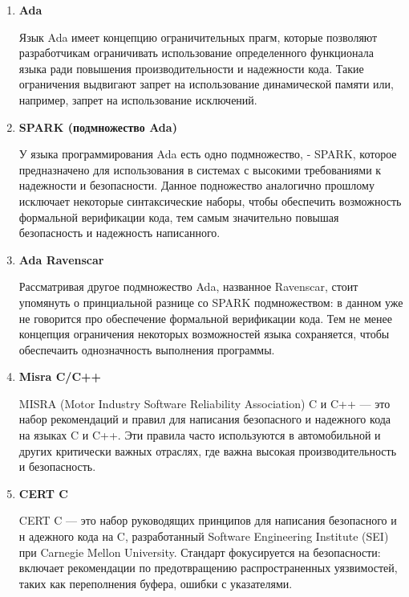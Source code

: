 \documentclass{mipt-thesis-bs}
\begin{document}
\begin{enumerate}
        \item \textbf{Ada}

        Язык Ada имеет концепцию ограничительных прагм, которые позволяют разработчикам ограничивать
        использование определенного функционала языка ради повышения производительности и надежности
        кода. Такие ограничения выдвигают запрет на использование динамической памяти или, например,
        запрет на использование исключений.

        \item \textbf{SPARK (подмножество Ada)}

        У языка программирования Ada есть одно подмножество, - SPARK, которое предназначено для
        использования в системах с высокими требованиями к надежности и безопасности. Данное
        подножество аналогично прошлому исключает некоторые синтаксические наборы, чтобы
        обеспечить возможность формальной верификации кода, тем самым значительно повышая
        безопасность и надежность написанного.

        \item \textbf{Ada Ravenscar}

        Рассматривая другое подмножество Ada, названное Ravenscar, стоит упомянуть о принциальной
        разнице со SPARK подмножеством: в данном уже не говорится про обеспечение формальной верификации
        кода. Тем не менее концепция ограничения некоторых возможностей языка сохраняется, чтобы
        обеспечаить однозначность выполнения программы.

        \item \textbf{Misra C/C++}

        MISRA (Motor Industry Software Reliability Association) C и C++ — это набор
        рекомендаций и правил для написания безопасного и надежного кода на
        языках C и C++. Эти правила часто используются в автомобильной и
        других критически важных отраслях, где важна высокая производительность и безопасность.

        \item \textbf{CERT C}

        CERT C — это набор руководящих принципов для написания безопасного и н
        адежного кода на C, разработанный Software Engineering Institute (SEI) при Carnegie Mellon University.
        Стандарт фокусируется на безопасности: включает рекомендации по предотвращению
        распространенных уязвимостей, таких как переполнения буфера, ошибки с указателями.


\end{enumerate}
\end{document}
